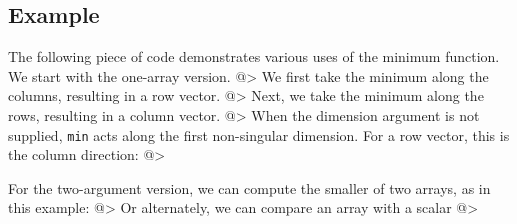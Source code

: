 \subsection{Example}

The following piece of code demonstrates various uses of the minimum
function.  We start with the one-array version.
@>
We first take the minimum along the columns, resulting in a row vector.
@>
Next, we take the minimum along the rows, resulting in a column vector.
@>
When the dimension argument is not supplied, \verb|min| acts along the first 
non-singular dimension.  For a row vector, this is the column direction:
@>

For the two-argument version, we can compute the smaller of two arrays,
as in this example:
@>
Or alternately, we can compare an array with a scalar
@>
